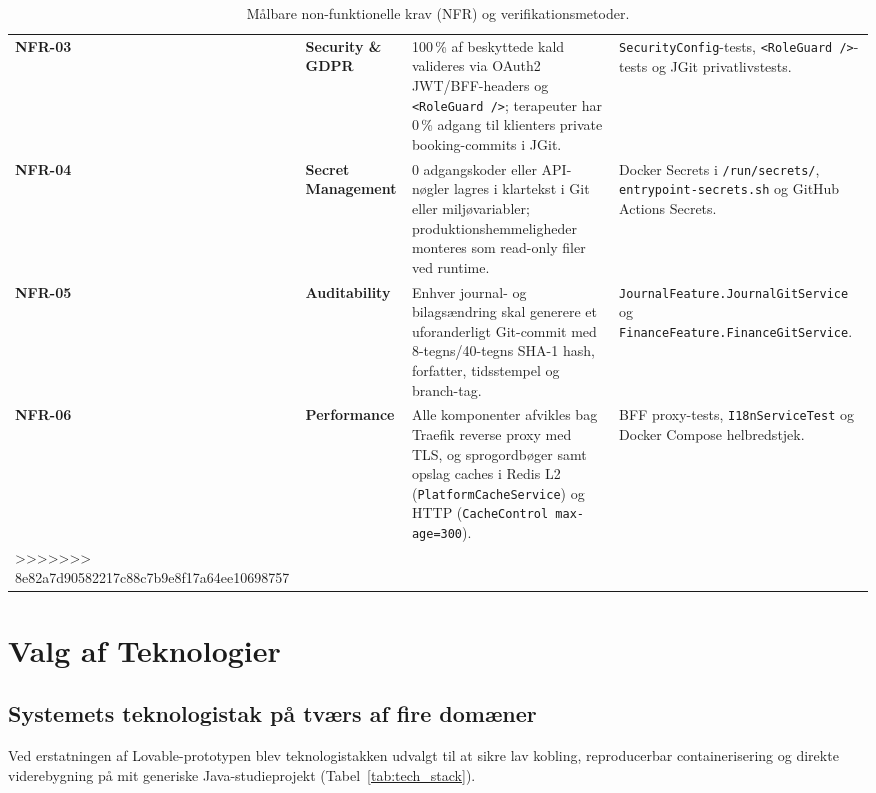 \documentclass[11pt,a4paper]{article}
\begin{document}
\begin{table}[htbp]
\begin{table}[htbp]
\begin{tabularx}{\textwidth}{P{1.4cm} P{2.6cm} Y P{3.8cm}}
\addlinespace
\textbf{NFR-03} & \textbf{Security \& GDPR} & 100\,\% af beskyttede kald valideres via OAuth2 JWT/BFF-headers og \texttt{<RoleGuard />}; terapeuter har 0\,\% adgang til klienters private booking-commits i JGit. & \texttt{SecurityConfig}-tests, \texttt{<RoleGuard />}-tests og JGit privatlivstests. \\
\addlinespace
\textbf{NFR-04} & \textbf{Secret Management} & 0 adgangskoder eller API-nøgler lagres i klartekst i Git eller miljøvariabler; produktionshemmeligheder monteres som read-only filer ved runtime. & Docker Secrets i \texttt{/run/secrets/}, \texttt{entrypoint-secrets.sh} og GitHub Actions Secrets. \\
\addlinespace
\textbf{NFR-05} & \textbf{Auditability} & Enhver journal- og bilagsændring skal generere et uforanderligt Git-commit med 8-tegns/40-tegns SHA-1 hash, forfatter, tidsstempel og branch-tag. & \texttt{JournalFeature.JournalGitService} og \texttt{FinanceFeature.FinanceGitService}. \\
\addlinespace
\textbf{NFR-06} & \textbf{Performance} & Alle komponenter afvikles bag Traefik reverse proxy med TLS, og sprogordbøger samt opslag caches i Redis L2 (\texttt{PlatformCacheService}) og HTTP (\texttt{CacheControl max-age=300}). & BFF proxy-tests, \texttt{I18nServiceTest} og Docker Compose helbredstjek. \\
>>>>>>> 8e82a7d90582217c88c7b9e8f17a64ee10698757
\bottomrule
\end{tabularx}
\caption{Målbare non-funktionelle krav (NFR) og verifikationsmetoder.}
\label{tab:nfr}
\end{table}

\section{Valg af Teknologier}

\subsection{Systemets teknologistak på tværs af fire domæner}
Ved erstatningen af Lovable-prototypen blev teknologistakken udvalgt til at sikre lav kobling, reproducerbar containerisering og direkte viderebygning på mit generiske Java-studieprojekt (Tabel~\ref{tab:tech_stack}).


\end{table}
\end{document}

